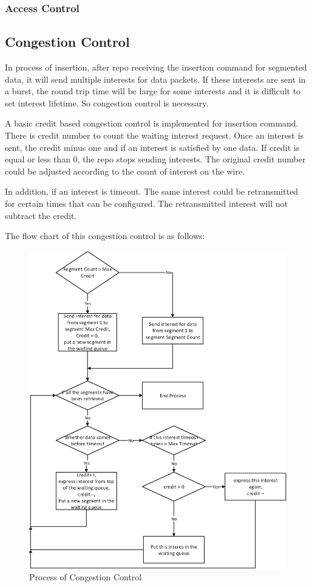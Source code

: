 \documentclass{acm_proc_article-sp}
\begin{document}
\subsubsection{Access Control}

\subsection{Congestion Control}
In process of insertion, after repo receiving the insertion command for segmented data, it will send multiple interests for data packets. If these interests are sent in a burst, the round trip time will be large for some interests and it is difficult to set interest lifetime. So congestion control is necessary.

A basic credit based congestion control is implemented for insertion command. There is credit number to count the waiting interest request. Once an interest is sent, the credit minus one and if an interest is satisfied by one data. If credit is equal or less than 0, the repo stops sending interests. The original credit number could be adjusted according to the count of interest on the wire.

In addition, if an interest is timeout. The same interest could be retransmitted for certain times that can be configured. The retransmitted interest will not subtract the credit.

The flow chart of this congestion control is as follows:

\begin{figure}
\centering
\includegraphics{Drawing5.eps}
\caption{Process of Congestion Control}
\end{figure}
\end{document}
